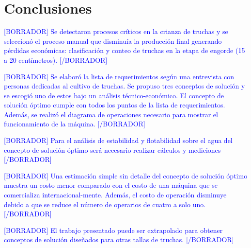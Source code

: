 
\pagestyle{myportland}
\doublespacing
\chapter*{\centering \large Conclusiones}
\thispagestyle{myportland}

\textcolor{blue}{[BORRADOR] Se detectaron procesos críticos en la crianza de truchas y se seleccionó el proceso manual que disminuía la producción final generando pérdidas económicas: clasificación y conteo de truchas en la etapa de engorde (15 a 20 centímetros). [/BORRADOR]} 
	
\textcolor{blue}{[BORRADOR] Se elaboró la lista de requerimientos según una entrevista con personas dedicadas al cultivo de truchas. Se propuso tres conceptos de solución y se escogió uno de estos bajo un análisis técnico-económico. El concepto de solución óptimo cumple con todos los puntos de la lista de requerimientos. Además, se realizó el diagrama de operaciones necesario para mostrar el funcionamiento de la máquina. [/BORRADOR]} 
	
\textcolor{blue}{[BORRADOR] Para el análisis de estabilidad y flotabilidad sobre el agua del concepto de solución óptimo será necesario realizar cálculos y mediciones  [/BORRADOR]} 
	
\textcolor{blue}{[BORRADOR] Una estimación simple sin detalle del concepto de solución óptimo muestra un costo menor comparado con el costo de una máquina que se comercializa internacional-mente. Además, el costo de operación disminuye debido a que se reduce el número de operarios de cuatro a solo uno. [/BORRADOR]} 
	
\textcolor{blue}{[BORRADOR] El trabajo presentado puede ser extrapolado para obtener conceptos de solución diseñados para otras tallas de truchas. [/BORRADOR]} 
